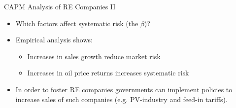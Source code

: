 {CAPM Analysis of RE Companies II}
\begin{itemize}
\item<1-> Which factors affect systematic risk (the $\beta$)?
\item<2-> Empirical analysis shows:
\begin{itemize}
\item Increases in sales growth reduce market risk
\item Increases in oil price returns increases systematic risk
\end{itemize}
\item<3-> In order to foster RE companies governments can implement policies to increase sales of such companies (e.g. PV-industry and feed-in tariffs).
\end{itemize}

